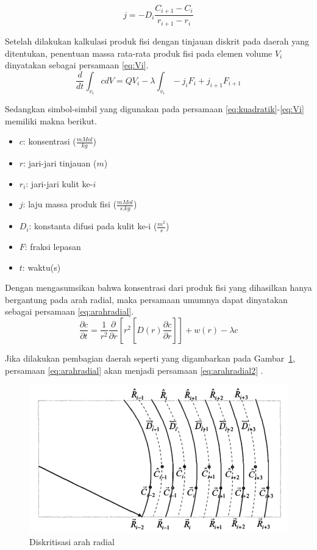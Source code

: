 \documentclass[a4paper,11pt]{report}
\renewcommand{\figurename}{Gambar}
\begin{document}
\begin{equation}
j=-D_i\frac{C_{i+1}-C_i}{r_{i+1}-r_i}
\label{eq:lajumassadii}  
\end{equation}

Setelah dilakukan kalkulasi produk fisi dengan tinjauan diskrit pada daerah yang ditentukan, penentuan massa rata-rata produk fisi pada elemen volume $V_i$  dinyatakan sebagai persamaan \ref{eq:Vi}.
\begin{equation}
  \frac{d}{dt}\int_{v_i}c dV = QV_i-\lambda \int_{v_i}-j_iF_i + j_{i+1}F_{i+1}
  \label{eq:Vi}
\end{equation}

Sedangkan simbol-simbil yang digunakan pada persamaan \ref{eq:kuadratik}-\ref{eq:Vi} memiliki makna berikut.
\begin{itemize}
  \item $c$: konsentrasi ($\frac{mMol}{kg}$)
  \item $r$: jari-jari tinjauan ($m$)
  \item $r_i$: jari-jari kulit ke-$i$
  \item $j$: laju massa produk fisi ($\frac{mMol}{s.kg}$)
  \item $D_i$: konstanta difusi pada kulit ke-i ($\frac{m^2}{s}$)
  \item $F$: fraksi lepasan
  \item $t$: waktu(s)
\end{itemize}

Dengan mengasumsikan bahwa konsentrasi dari produk fisi yang dihasilkan hanya bergantung pada arah radial, maka persamaan umumnya dapat dinyatakan sebagai persamaan \ref{eq:arahradial}. 
\begin{equation}
  \frac{\partial c}{\partial t}=\frac{1}{r^2}\frac{\partial}{\partial r} \left[r^2\left[D(r)\frac{\partial c}{\partial r}\right] \right]+w(r)-\lambda c
  \label{eq:arahradial}
\end{equation}

Jika dilakukan pembagian daerah seperti yang digambarkan pada \figurename~\ref{fig:diskarahradial}, persamaan \ref{eq:arahradial} akan menjadi persamaan \ref{eq:arahradial2} \cite{keshaw}.

\begin{figure}[h!]
  \begin{center}
    \includegraphics[scale=.35]{pics/arahradial.png}
    \caption{Diskritisasi arah radial \cite{keshaw}}
    \label{fig:diskarahradial}
  \end{center}
\end{figure}
\end{document}
